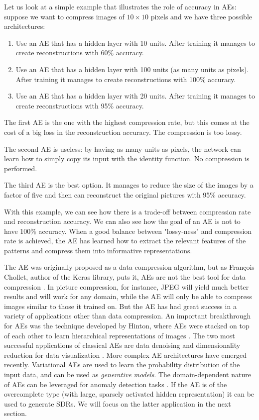 \documentclass{article}
\begin{document}
Let us look at a simple example that illustrates the role of accuracy in AEs: suppose we want to compress images of $10 \times 10$ pixels and we have three possible architectures:
\begin{enumerate}
    \item Use an AE that has a hidden layer with 10 units. After training it manages to create reconstructions with 60\% accuracy.
    \item Use an AE that has a hidden layer with 100 units (as many units as pixels). After training it manages to create reconstructions with 100\% accuracy.
    \item Use an AE that has a hidden layer with 20 units. After training it manages to create reconstructions with 95\% accuracy.
\end{enumerate}

The first AE is the one with the highest compression rate, but this comes at the cost of a big loss in the reconstruction accuracy. The compression is too lossy.

The second AE is useless: by having as many units as pixels, the network can learn how to simply copy its input with the identity function. No compression is performed.

The third AE is the best option. It manages to reduce the size of the images by a factor of five and then can reconstruct the original pictures with 95\% accuracy.

With this example, we can see how there is a trade-off between compression rate and reconstruction accuracy. We can also see how the goal of an AE is not to have 100\% accuracy. When a good balance between "lossy-ness" and compression rate is achieved, the AE has learned how to extract the relevant features of the patterns and compress them into informative representations.
\newline

The AE was originally proposed as a data compression algorithm, but as François Chollet, author of the Keras library, puts it, AEs are not the best tool for data compression \cite{chollet2016building}. In picture compression, for instance, JPEG will yield much better results and will work for any domain, while the AE will only be able to compress images similar to those it trained on.
But the AE has had great success in a variety of applications other than data compression.
An important breakthrough for AEs was the technique developed by Hinton, where AEs were stacked on top of each other to learn hierarchical representations of images \cite{krizhevsky2011using}.
The two most successful applications of classical AEs are data denoising \cite{cho2013simple}  and dimensionality reduction for data visualization \cite{hinton2006reducing}.
More complex AE architectures have emerged recently. Variational AEs \cite{kingma2013auto} are used to learn the probability distribution of the input data, and can be used as \textit{generative models}. The domain-dependent nature of AEs can be leveraged for anomaly detection tasks \cite{sakurada2014anomaly, an2015variational}. If the AE is of the overcomplete type (with large, sparsely activated hidden representation) it can be used to generate SDRs. We will focus on the latter application in the next section.
\end{document}
